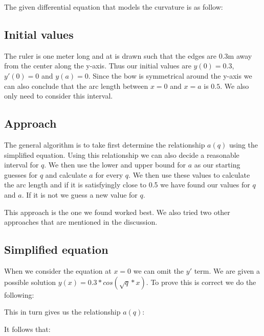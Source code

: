 The given differential equation that models the curvature is as follow:

\begin{center}
    
\end{center}

\subsection{Initial values}
The ruler is one meter long and at is drawn such that the edges are 0.3m away from the center along the y-axis. Thus our initial values are $y(0)=0.3$, $y'(0)=0$ and $y(a)=0$. Since the bow is symmetrical around the y-axis we can also conclude that the arc length between $x=0$ and $x=a$ is $0.5$. We also only need to consider this interval. 

\subsection{Approach}
The general algorithm is to take first determine the relationship $a(q)$ using the simplified equation. Using this relationship we can also decide a reasonable interval for $q$. We then use the lower and upper bound for $a$ as our starting guesses for $q$ and calculate $a$ for every $q$. We then use these values to calculate the arc length and if it is satisfyingly close to 0.5 we have found our values for $q$ and $a$. If it is not we guess a new value for $q$.

This approach is the one we found worked best. We also tried two other approaches that are mentioned in the discussion. 

\subsection{Simplified equation}
When we consider the equation at $x=0$ we can omit the $y'$ term. We are given a possible solution $y(x)=0.3*cos(\sqrt{q}*x)$. To prove this is correct we do the following:

\begin{center}
        
\end{center}

This in turn gives us the relationship $a(q)$:

\begin{center}
    
\end{center}

It follows that:


